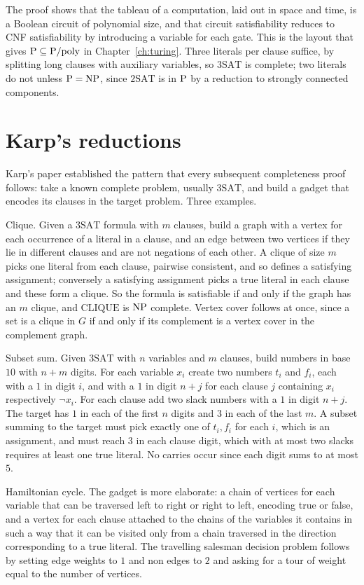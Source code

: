 The proof shows that the tableau of a computation, laid out in space and time, is a Boolean circuit of polynomial size, and that circuit satisfiability reduces to CNF satisfiability by introducing a variable for each gate. This is the layout that gives $\mathrm{P} \subseteq \mathrm{P}/\mathrm{poly}$ in Chapter~\ref{ch:turing}. Three literals per clause suffice, by splitting long clauses with auxiliary variables, so $3\mathrm{SAT}$ is complete; two literals do not unless $\mathrm{P} = \mathrm{NP}$, since $2\mathrm{SAT}$ is in $\mathrm{P}$ by a reduction to strongly connected components.

\section{Karp's reductions}

Karp's paper established the pattern that every subsequent completeness proof follows: take a known complete problem, usually $3\mathrm{SAT}$, and build a gadget that encodes its clauses in the target problem. Three examples.

Clique. Given a $3\mathrm{SAT}$ formula with $m$ clauses, build a graph with a vertex for each occurrence of a literal in a clause, and an edge between two vertices if they lie in different clauses and are not negations of each other. A clique of size $m$ picks one literal from each clause, pairwise consistent, and so defines a satisfying assignment; conversely a satisfying assignment picks a true literal in each clause and these form a clique. So the formula is satisfiable if and only if the graph has an $m$ clique, and $\mathrm{CLIQUE}$ is $\mathrm{NP}$ complete. Vertex cover follows at once, since a set is a clique in $G$ if and only if its complement is a vertex cover in the complement graph.

Subset sum. Given $3\mathrm{SAT}$ with $n$ variables and $m$ clauses, build numbers in base $10$ with $n + m$ digits. For each variable $x_i$ create two numbers $t_i$ and $f_i$, each with a $1$ in digit $i$, and with a $1$ in digit $n + j$ for each clause $j$ containing $x_i$ respectively $\neg x_i$. For each clause add two slack numbers with a $1$ in digit $n + j$. The target has $1$ in each of the first $n$ digits and $3$ in each of the last $m$. A subset summing to the target must pick exactly one of $t_i, f_i$ for each $i$, which is an assignment, and must reach $3$ in each clause digit, which with at most two slacks requires at least one true literal. No carries occur since each digit sums to at most $5$.

Hamiltonian cycle. The gadget is more elaborate: a chain of vertices for each variable that can be traversed left to right or right to left, encoding true or false, and a vertex for each clause attached to the chains of the variables it contains in such a way that it can be visited only from a chain traversed in the direction corresponding to a true literal. The travelling salesman decision problem follows by setting edge weights to $1$ and non edges to $2$ and asking for a tour of weight equal to the number of vertices.

